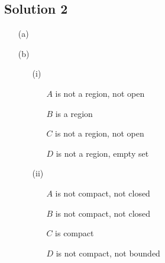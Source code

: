 \subsection*{Solution 2}

\begin{itemize}
\item[(a)]
\todo

\item[(b)]
\begin{itemize}
\item[(i)]

\begin{itemize}
\item[$A$] is not a region, not open
\item[$B$] is a region
\item[$C$] is not a region, not open
\item[$D$] is not a region, empty set
\end{itemize}

\item[(ii)]

\begin{itemize}
\item[$A$] is not compact, not closed
\item[$B$] is not compact, not closed
\item[$C$] is compact
\item[$D$] is not compact, not bounded
\end{itemize}

\end{itemize}

\end{itemize}

